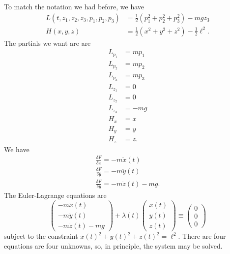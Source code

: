 \documentclass[11pt]{article}
\begin{document}
\begin{enumerate}
To match the notation we had before, we have
\begin{align*}
L(t, z_1,z_2,z_3, p_1,p_2,p_3) &= \frac{1}{2} (p_1^2 + p_2^2 + p_3^2) - mgz_3 \\
H(x,y,z) &= \frac{1}{2} (x^2+y^2+z^2) - \frac{1}{2} \ell^2.
\end{align*}
The partials we want are are
\begin{align*}
L_{p_1} &= mp_1 \\
L_{p_2} &= mp_2 \\
L_{p_3} &= mp_3 \\
L_{z_1} &= 0 \\
L_{z_2} &= 0 \\
L_{z_3} &= -mg \\
H_x &= x \\
H_y &= y \\
H_z &= z.
\end{align*}
We have
\begin{align*}
\frac{\delta F}{\delta x} = -m \ddot{x}(t) \\
\frac{\delta F}{\delta y} = -m \ddot{y}(t) \\
\frac{\delta F}{\delta y} = -m \ddot{z}(t) - mg.
\end{align*}
The Euler-Lagrange equations are
\[
\begin{pmatrix}
-m \ddot{x}(t) \\
-m \ddot{y}(t) \\
-m \ddot{z}(t) - mg
\end{pmatrix} + \lambda (t) \begin{pmatrix}
x(t) \\ y(t) \\ z(t)
\end{pmatrix} \equiv \begin{pmatrix}
0 \\ 0 \\ 0
\end{pmatrix}
\]
subject to the constraint $x(t)^2 + y(t)^2 + z(t)^2 = \ell^2$. There are four equations are four unknowns, so, in principle, the system may be solved.


\end{enumerate}
\end{document}
